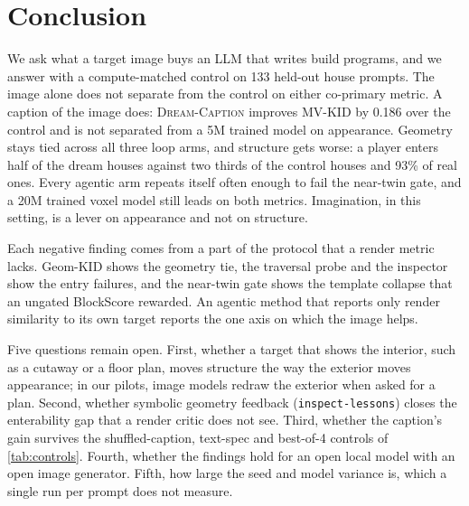 \section{Conclusion}
\label{sec:conclusion}

We ask what a target image buys an LLM that writes build programs, and we answer with a compute-matched control on 133 held-out house prompts. %
The image alone does not separate from the control on either co-primary metric. %
A caption of the image does: \textsc{Dream-Caption} improves MV-KID by 0.186 over the control and is not separated from a 5M trained model on appearance. %
Geometry stays tied across all three loop arms, and structure gets worse: a player enters half of the dream houses against two thirds of the control houses and 93\% of real ones. %
Every agentic arm repeats itself often enough to fail the near-twin gate, and a 20M trained voxel model still leads on both metrics. %
Imagination, in this setting, is a lever on appearance and not on structure.

Each negative finding comes from a part of the protocol that a render metric lacks. %
Geom-KID shows the geometry tie, the traversal probe and the inspector show the entry failures, and the near-twin gate shows the template collapse that an ungated BlockScore rewarded. %
An agentic method that reports only render similarity to its own target reports the one axis on which the image helps.

Five questions remain open. %
First, whether a target that shows the interior, such as a cutaway or a floor plan, moves structure the way the exterior moves appearance; in our pilots, image models redraw the exterior when asked for a plan. %
Second, whether symbolic geometry feedback (\texttt{inspect-lessons}) closes the enterability gap that a render critic does not see. %
Third, whether the caption's gain survives the shuffled-caption, text-spec and best-of-4 controls of \cref{tab:controls}. 
Fourth, whether the findings hold for an open local model with an open image generator. %
Fifth, how large the seed and model variance is, which a single run per prompt does not measure.
